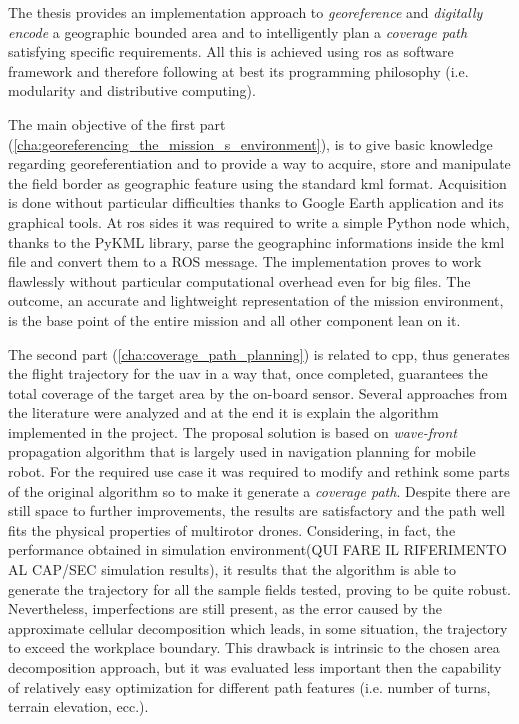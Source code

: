 The thesis provides  an implementation approach to \textit{georeference} and \textit{digitally encode} a geographic bounded area and to intelligently plan a \textit{coverage path} satisfying specific requirements. All this is achieved using \acrshort{ros} as software framework and therefore following at best its programming philosophy (i.e. modularity and distributive computing).\par
The main objective of the first part (\autoref{cha:georeferencing_the_mission_s_environment}), is to give basic knowledge regarding georeferentiation and to provide a way to acquire, store and manipulate the field border as geographic feature using the standard \acrfull{kml} format. Acquisition is done without particular difficulties thanks to Google Earth application and its graphical tools. At \acrshort{ros} sides it was required to write a simple Python node which, thanks to the \textsf{PyKML library}, parse the geographinc informations inside the \acrshort{kml} file and convert them to a ROS message. The implementation proves to work flawlessly without particular computational overhead even for big files. The outcome, an accurate and lightweight representation of the mission environment, is the base point of the entire mission and all other component lean on it.\par
The second part (\autoref{cha:coverage_path_planning}) is related to \acrfull{cpp}, thus generates the flight trajectory for the \acrshort{uav} in a way that, once completed, guarantees the total coverage of the target area by the on-board sensor. Several approaches from the literature were analyzed and at the end it is explain the algorithm implemented in the project. The proposal solution is based on \textit{wave-front} propagation algorithm that is largely used in navigation planning for mobile robot. For the required use case it was required to modify and rethink some parts of the original algorithm so to make it generate a \textit{coverage path}. Despite there are still space to further improvements, the results are satisfactory and the path well fits the physical properties of multirotor drones. Considering, in fact, the performance obtained in simulation environment(QUI FARE IL RIFERIMENTO AL CAP/SEC simulation results), it results that the algorithm is able to generate the trajectory for all the sample fields tested, proving to be quite robust.\\
Nevertheless, imperfections are still present, as the error caused by the approximate cellular decomposition which leads, in some situation, the trajectory to exceed the workplace boundary.
This drawback is intrinsic to the chosen area decomposition approach, but it was evaluated less important then the capability of relatively easy optimization for different path features (i.e. number of turns, terrain elevation, ecc.).\par

